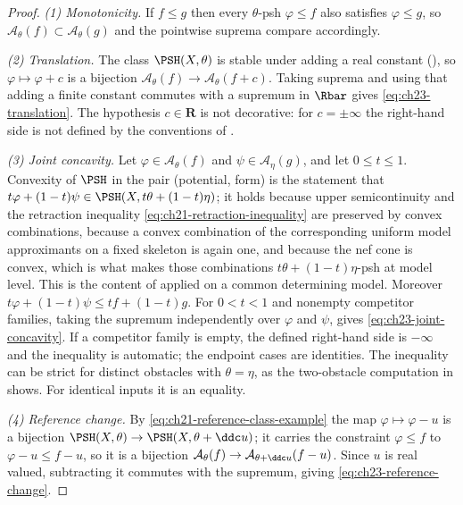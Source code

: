\begin{proof}
\emph{(1) Monotonicity.}  If $f\leq g$ then every $\theta$-psh
$\varphi\leq f$ also satisfies $\varphi\leq g$, so
$\mathcal A_\theta(f)\subset\mathcal A_\theta(g)$ and the pointwise
suprema compare accordingly.

\emph{(2) Translation.}  The class $\PSH(X,\theta)$ is stable under adding
a real constant (), so
$\varphi\mapsto\varphi+c$ is a bijection
$\mathcal A_\theta(f)\to\mathcal A_\theta(f+c)$.  Taking suprema and using
that adding a finite constant commutes with a supremum in $\Rbar$ gives
\eqref{eq:ch23-translation}.  The hypothesis $c\in\mathbf R$ is not
decorative: for $c=\pm\infty$ the right-hand side is not defined by the
conventions of .

\emph{(3) Joint concavity.}  Let $\varphi\in\mathcal A_\theta(f)$ and
$\psi\in\mathcal A_\eta(g)$, and let $0\leq t\leq1$.  Convexity of
$\PSH$ in the pair (potential, form) is the statement that
$t\varphi+(1-t)\psi\in\PSH(X,t\theta+(1-t)\eta)$; it holds because upper
semicontinuity and the retraction inequality
\eqref{eq:ch21-retraction-inequality} are preserved by convex combinations,
because a convex combination of the corresponding uniform model approximants
on a fixed skeleton is again one, and because the nef cone is convex, which
is what makes those combinations $t\theta+(1-t)\eta$-psh at model level.
This is the content of  applied on a
common determining model.  Moreover
$t\varphi+(1-t)\psi\leq tf+(1-t)g$.  For $0<t<1$ and nonempty competitor
families, taking the supremum independently over
$\varphi$ and $\psi$,
gives \eqref{eq:ch23-joint-concavity}.  If a competitor family is empty,
the defined right-hand side is $-\infty$ and the inequality is automatic;
the endpoint cases are identities.
The inequality can be strict for distinct obstacles with
$\theta=\eta$, as the two-obstacle computation in
 shows.  For identical inputs it is
an equality.

\emph{(4) Reference change.}  By
\eqref{eq:ch21-reference-class-example} the map $\varphi\mapsto\varphi-u$
is a bijection
$\PSH(X,\theta)\to\PSH(X,\theta+\ddc u)$; it carries the constraint
$\varphi\leq f$ to $\varphi-u\leq f-u$, so it is a bijection
$\mathcal A_\theta(f)\to\mathcal A_{\theta+\ddc u}(f-u)$.  Since $u$ is
real valued, subtracting it commutes with the supremum, giving
\eqref{eq:ch23-reference-change}.


\end{proof}
